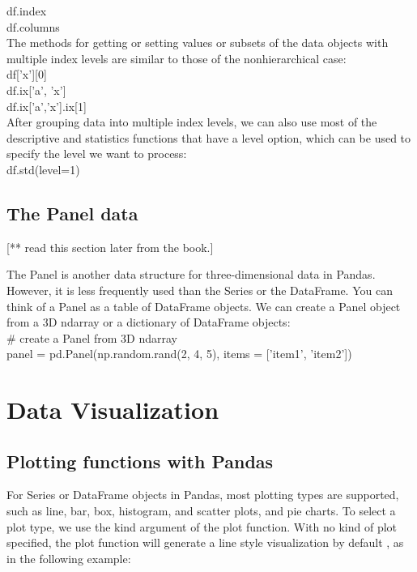 \documentclass{article}
\numberwithin{equation}{section} %
\begin{document}
df.index \\

df.columns \\

The methods for getting or setting values or subsets of the data objects with multiple
index levels are similar to those of the nonhierarchical case: \\

df['x'][0] \\

df.ix['a', 'x'] \\

df.ix['a','x'].ix[1] \\

After grouping data into multiple index levels, we can also use most of the descriptive and statistics functions that have a level option, which can be used to
specify the level we want to process: \\

df.std(level=1) \\

\subsection*{The Panel data}

[** read this section later from the book.]

The Panel is another data structure for three-dimensional data in Pandas. However, it is less frequently used than the Series or the DataFrame. You can think of a Panel as a table of DataFrame objects. We can create a Panel object from a 3D ndarray or a dictionary of DataFrame objects: \\

\# create a Panel from 3D ndarray \\

panel = pd.Panel(np.random.rand(2, 4, 5), items = ['item1', 'item2']) \\


\section*{Data Visualization}

\subsection*{Plotting functions with Pandas}

For Series or DataFrame objects in Pandas, most plotting types are supported, such as line, bar, box, histogram, and scatter plots, and pie charts. To select a plot type, we use the kind argument of the plot function. With no kind of plot specified, the plot function will generate a line style visualization by default , as in the following example:
\end{document}
